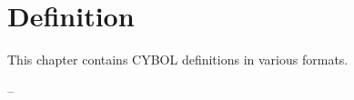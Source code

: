 %
%
%
%
%
%

\chapter{Definition}
\label{definition_heading}

This chapter contains CYBOL definitions in various formats.





--

%



%
%
